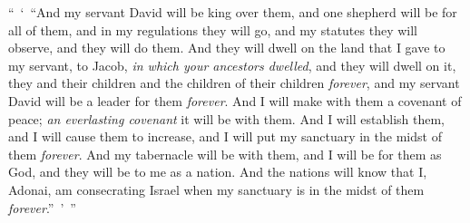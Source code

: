 \begin{biblechapter}
\verse “ ‘ “And my servant David will be king over them, and one shepherd will be for all of them, and in my regulations they will go, and my statutes they will observe, and they will do them.
\verse And they will dwell on the land that I gave to my servant, to Jacob, \textit{in which your ancestors dwelled}, and they will dwell on it, they and their children and the children of their children \textit{forever}, and my servant David will be a leader for them \textit{forever}.
\verse And I will make with them a covenant of peace; \textit{an everlasting covenant} it will be with them. And I will establish them, and I will cause them to increase, and I will put my sanctuary in the midst of them \textit{forever}.
\verse And my tabernacle will be with them, and I will be for them as God, and they will be to me as a nation.
\verse And the nations will know that I, Adonai, am consecrating Israel when my sanctuary is in the midst of them \textit{forever}.” ’ ”
\end{biblechapter}

